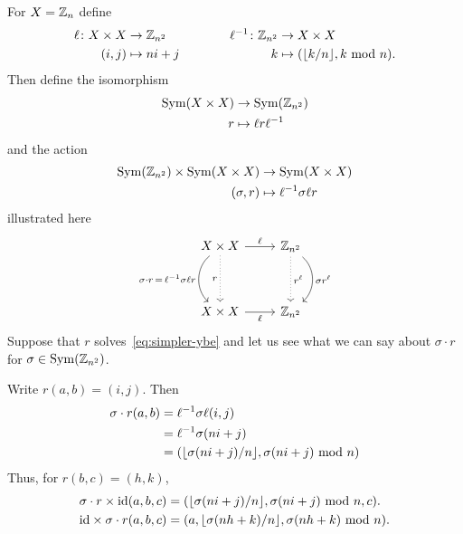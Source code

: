 \begin{xmpl}
    For $X=\mathbb{Z}_n$ define
    $$
    \begin{matrix}
        \begin{aligned}
            \ell\colon X\times X&\to\mathbb{Z}_{n^2}\\
            (i,j)&\mapsto ni+j
        \end{aligned}
        &
        \qquad
        &
        \begin{aligned}
            \ell^{-1}\colon\mathbb{Z}_{n^2}&\to X\times X\\
            k&\mapsto (\lfloor k/n\rfloor,k\,\operatorname{mod}\,n).
        \end{aligned}
    \end{matrix}
    $$
    Then define the isomorphism
    \begin{align*}
        {\rm Sym}(X\times X)&\to{\rm Sym}(\mathbb{Z}_{n^2})\\
        r&\mapsto\ell r\ell^{-1}
    \end{align*}
    and the action
    \begin{align*}
        {\rm Sym}(\mathbb{Z}_{n^2})\times{\rm Sym}(X\times X)&\to{\rm Sym}(X\times X)\\
            (\sigma,r)&\mapsto\ell^{-1}\sigma\ell r
    \end{align*}
    illustrated here
    $$
        \begin{tikzcd}[row sep=huge]
        X\times X
                \arrow[r,"\ell"]
                \arrow[d,"r"',dotted]
                \arrow[d,
                "\sigma\cdot r\,=\,\ell^{-1}\sigma\ell r"',
                    bend right=49]
            &\Z_{n^2}
                \arrow[d,bend left=49,"\sigma r^\ell"]
                \arrow[d,dotted,"r^\ell"]\\
        X\times X
                \arrow[r,"\ell"']
            &\Z_{n^2}
        \end{tikzcd}
    $$
    Suppose that $r$ solves~\eqref{eq:simpler-ybe} and let us see what we can say about $\sigma\cdot r$ for $\sigma\in{\rm Sym}(\mathbb{Z}_{n^2})$.

    Write $r(a,b)=(i,j)$. Then
    \begin{align*}
        \sigma\cdot r(a,b) &= \ell^{-1}\sigma\ell(i,j)\\
            &= \ell^{-1}\sigma(ni+j)\\
            &= (\lfloor\sigma(ni+j)/n\rfloor,\sigma(ni+j)\,\operatorname{mod}\,n)
    \end{align*}
    Thus, for $r(b,c)=(h,k)$,
    \begin{align*}
        \sigma\cdot r\times\operatorname{id}(a,b,c)
            &= (\lfloor\sigma(ni+j)/n\rfloor
                ,\sigma(ni+j)\,\operatorname{mod}\,n
                ,c).\\
        {\operatorname{id}}\times\sigma\cdot r(a,b,c)
            &=(a
                ,\lfloor\sigma(nh+k)/n\rfloor
                ,\sigma(nh+k)\,\operatorname{mod}\,n).
    \end{align*}
\end{xmpl}

